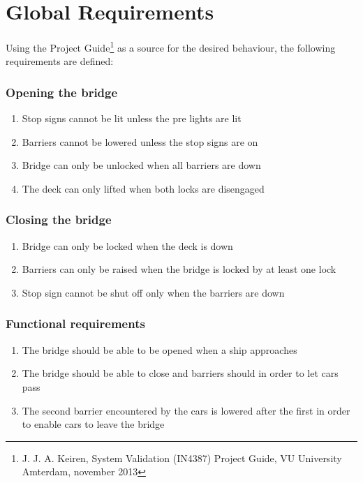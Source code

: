 \section{Global Requirements}
\label{sec:glob}

Using the Project Guide\footnote{J. J. A. Keiren, System Validation (IN4387)
Project Guide, VU University Amterdam, november 2013} as a source for the
desired behaviour, the following requirements are defined:

\subsubsection*{Opening the bridge}
\begin{enumerate}
	\item Stop signs cannot be lit unless the pre lights are lit
	\item Barriers cannot be lowered unless the stop signs are on
	\item Bridge can only be unlocked when all barriers are down
	\item The deck can only lifted when both locks are disengaged
	\setcounter{enumTemp}{\theenumi}
\end{enumerate}

\subsubsection*{Closing the bridge}
\begin{enumerate}
	\setcounter{enumi}{\theenumTemp}
	\item Bridge can only be locked when the deck is down
	\item Barriers can only be raised when the bridge is locked by at least one
	      lock
	\item Stop sign cannot be shut off only when the barriers are down
	\setcounter{enumTemp}{\theenumi}
\end{enumerate}

\subsubsection*{Functional requirements}
\begin{enumerate}
	\setcounter{enumi}{\theenumTemp}
	\item The bridge should be able to be opened when a ship approaches
	\item The bridge should be able to close and barriers should in order to
	      let cars pass
	\item The second barrier encountered by the cars is lowered after
	      the first in order to enable cars to leave the bridge
	\setcounter{enumTemp}{\theenumi}
\end{enumerate}

